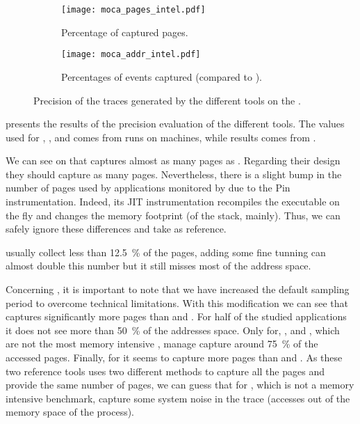 \begin{figure}[htb]
    \centering
    \begin{subfigure}{\linewidth}
        \texttt{[image: moca\_pages\_intel.pdf]}
        \caption{Percentage of captured pages.}
        \label{fig:pages}
    \end{subfigure}
    \begin{subfigure}{\linewidth}
        \texttt{[image: moca\_addr\_intel.pdf]}
        \caption{Percentages of events captured (compared to \Moca).}
        \label{fig:addr}
    \end{subfigure}
    \caption{Precision of the traces generated by the different tools on the \NPB.}
    \label{fig:pages-addr}
\end{figure}

 presents the results of the precision evaluation of the
different tools. The values used for \Mitos, \MitosTun, \Moca and
\TABARNAC comes from runs on \Edel machines, while \MemProf results comes from
\Idfreeze.

We can see on  that \Moca captures almost as many pages as \TABARNAC.
Regarding their design they should capture as many pages. Nevertheless, there is a slight
bump in the number of pages used by applications monitored by \TABARNAC due to the Pin instrumentation.
Indeed, its JIT instrumentation recompiles the executable on the fly and changes the memory footprint
(of the stack, mainly). Thus, we can safely ignore these differences and take \Moca as reference.

\Mitos usually collect less than \SI{12.5}{\%} of the pages, adding some fine tunning
can almost double this number but it still misses most of the address space.

Concerning \MemProf, it is important to note that we have increased the
default sampling period to overcome technical limitations. With this
modification we can see that \MemProf captures significantly more pages than
\Mitos and \MitosTun. For half of the studied applications it does
not see more than \SI{50}{\%} of the addresses space. Only for, \BT, \LU and \UA,
which are not the most memory intensive \NPB, 
\MemProf manage capture around \SI{75}{\%} of the accessed pages. Finally, for
\SP it seems to capture more pages than \TABARNAC and \Moca. As these two reference
tools uses two different methods to capture all the pages and provide the 
same number of pages, we can guess that for \SP, which is not a memory
intensive benchmark, \MemProf capture some system noise in the trace (accesses out
of the memory space of the process).

